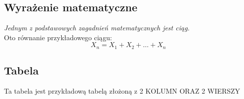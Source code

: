 \documentclass[a4paper]{article}
\begin{document}
\subsection{Wyrażenie matematyczne}
\textit{Jednym z podstawowych zagadnień matematycznych jest ciąg.\\}
\huge Oto równanie przykładowego ciągu:
\[ X^{}_{n} = X^{}_{1} + X^{}_{2} + \dots + X^{}_{n} \]

\subsection{Tabela}
Ta tabela jest przykładową tabelą złożoną z
\MakeUppercase{2 kolumn oraz 2 wierszy\\}

\end{document}
